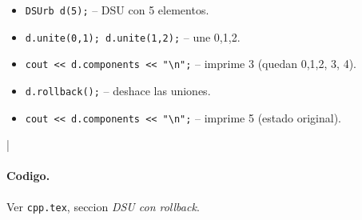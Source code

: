 \begin{itemize}\setlength\itemsep{0pt}
	\item \texttt{DSUrb d(5);} -- DSU con 5 elementos.
	\item \texttt{d.unite(0,1); d.unite(1,2);} -- une 0,1,2.
	\item \texttt{cout << d.components << "\textbackslash n";} -- imprime 3 (quedan {0,1,2}, {3}, {4}).
	\item \texttt{d.rollback();} -- deshace las uniones.
	\item \texttt{cout << d.components << "\textbackslash n";} -- imprime 5 (estado original).
\end{itemize}
|\paragraph{Codigo.}
Ver \texttt{cpp.tex}, seccion \textit{DSU con rollback}.

\vspace{0.5em|||}
